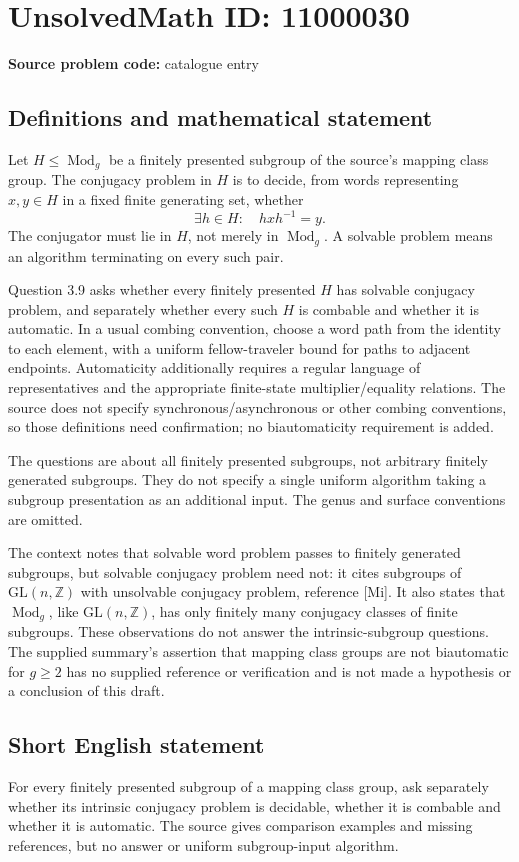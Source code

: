 \documentclass[11pt]{article}
\newcommand{\Z}{\mathbb{Z}}
\begin{document}
\section*{UnsolvedMath ID: 11000030}
\textbf{Source problem code:} catalogue entry
\subsection{Definitions and mathematical statement}
Let \(H\le\operatorname{Mod}_g\) be a finitely presented subgroup of the source's mapping class group. The conjugacy problem in \(H\) is to decide, from words representing \(x,y\in H\) in a fixed finite generating set, whether
\[
 \exists h\in H:\quad hxh^{-1}=y.
\]
The conjugator must lie in \(H\), not merely in \(\operatorname{Mod}_g\). A solvable problem means an algorithm terminating on every such pair.

Question 3.9 asks whether every finitely presented \(H\) has solvable conjugacy problem, and separately whether every such \(H\) is combable and whether it is automatic. In a usual combing convention, choose a word path from the identity to each element, with a uniform fellow-traveler bound for paths to adjacent endpoints. Automaticity additionally requires a regular language of representatives and the appropriate finite-state multiplier/equality relations. The source does not specify synchronous/asynchronous or other combing conventions, so those definitions need confirmation; no biautomaticity requirement is added.

The questions are about all finitely presented subgroups, not arbitrary finitely generated subgroups. They do not specify a single uniform algorithm taking a subgroup presentation as an additional input. The genus and surface conventions are omitted.

The context notes that solvable word problem passes to finitely generated subgroups, but solvable conjugacy problem need not: it cites subgroups of \(\mathrm{GL}(n,\Z)\) with unsolvable conjugacy problem, reference [Mi]. It also states that \(\operatorname{Mod}_g\), like \(\mathrm{GL}(n,\Z)\), has only finitely many conjugacy classes of finite subgroups. These observations do not answer the intrinsic-subgroup questions. The supplied summary's assertion that mapping class groups are not biautomatic for \(g\ge2\) has no supplied reference or verification and is not made a hypothesis or a conclusion of this draft.
\subsection{Short English statement}
For every finitely presented subgroup of a mapping class group, ask separately whether its intrinsic conjugacy problem is decidable, whether it is combable and whether it is automatic. The source gives comparison examples and missing references, but no answer or uniform subgroup-input algorithm.
\end{document}
